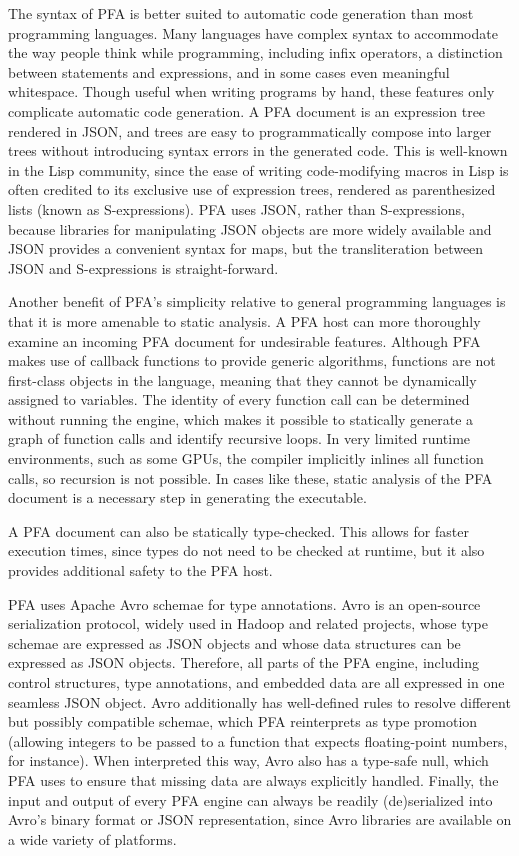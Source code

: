 \documentclass{article}
\theoremstyle{definition}
\begin{document}
The syntax of PFA is better suited to automatic code generation than most programming languages.  Many languages have complex syntax to accommodate the way people think while programming, including infix operators, a distinction between statements and expressions, and in some cases even meaningful whitespace.  Though useful when writing programs by hand, these features only complicate automatic code generation.  A PFA document is an expression tree rendered in JSON, and trees are easy to programmatically compose into larger trees without introducing syntax errors in the generated code.  This is well-known in the Lisp community, since the ease of writing code-modifying macros in Lisp is often credited to its exclusive use of expression trees, rendered as parenthesized lists (known as S-expressions).  PFA uses JSON, rather than S-expressions, because libraries for manipulating JSON objects are more widely available and JSON provides a convenient syntax for maps, but the transliteration between JSON and S-expressions is straight-forward.

Another benefit of PFA's simplicity relative to general programming languages is that it is more amenable to static analysis.  A PFA host can more thoroughly examine an incoming PFA document for undesirable features.  Although PFA makes use of callback functions to provide generic algorithms, functions are not first-class objects in the language, meaning that they cannot be dynamically assigned to variables.  The identity of every function call can be determined without running the engine, which makes it possible to statically generate a graph of function calls and identify recursive loops.  In very limited runtime environments, such as some GPUs, the compiler implicitly inlines all function calls, so recursion is not possible.  In cases like these, static analysis of the PFA document is a necessary step in generating the executable.

A PFA document can also be statically type-checked.  This allows for faster execution times, since types do not need to be checked at runtime, but it also provides additional safety to the PFA host.

PFA uses Apache Avro schemae for type annotations.  Avro is an open-source serialization protocol, widely used in Hadoop and related projects, whose type schemae are expressed as JSON objects and whose data structures can be expressed as JSON objects.  Therefore, all parts of the PFA engine, including control structures, type annotations, and embedded data are all expressed in one seamless JSON object.  Avro additionally has well-defined rules to resolve different but possibly compatible schemae, which PFA reinterprets as type promotion (allowing integers to be passed to a function that expects floating-point numbers, for instance).  When interpreted this way, Avro also has a type-safe null, which PFA uses to ensure that missing data are always explicitly handled.  Finally, the input and output of every PFA engine can always be readily (de)serialized into Avro's binary format or JSON representation, since Avro libraries are available on a wide variety of platforms.
\end{document}
